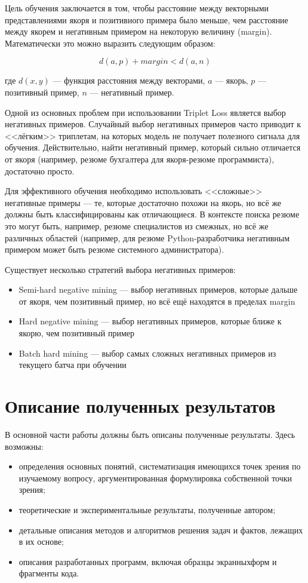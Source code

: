 \documentclass[14pt]{mmcs_article}
\begin{document}
Цель обучения заключается в том, чтобы расстояние между векторными представлениями якоря и позитивного примера было меньше, чем расстояние между якорем и негативным примером на некоторую величину (margin). Математически это можно выразить следующим образом:

\[ d(a,p) + margin < d(a,n) \]

где $d(x,y)$ --- функция расстояния между векторами, $a$ --- якорь, $p$ --- позитивный пример, $n$ --- негативный пример.

Одной из основных проблем при использовании Triplet Loss является выбор негативных примеров. Случайный выбор негативных примеров часто приводит к <<лёгким>> триплетам, на которых модель не получает полезного сигнала для обучения. Действительно, найти негативный пример, который сильно отличается от якоря (например, резюме бухгалтера для якоря-резюме программиста), достаточно просто.

Для эффективного обучения необходимо использовать <<сложные>> негативные примеры --- те, которые достаточно похожи на якорь, но всё же должны быть классифицированы как отличающиеся. В контексте поиска резюме это могут быть, например, резюме специалистов из смежных, но всё же различных областей (например, для резюме Python-разработчика негативным примером может быть резюме системного администратора).

Существует несколько стратегий выбора негативных примеров:
\begin{itemize}
  \item Semi-hard negative mining --- выбор негативных примеров, которые дальше от якоря, чем позитивный пример, но всё ещё находятся в пределах margin
  \item Hard negative mining --- выбор негативных примеров, которые ближе к якорю, чем позитивный пример
  \item Batch hard mining --- выбор самых сложных негативных примеров из текущего батча при обучении
\end{itemize}




\newpage
\section{Описание полученных результатов}\label{dsfs}

В основной части работы должны быть описаны полученные результаты. Здесь возможны:
\begin{itemize}
  \item определения основных понятий, систематизация имеющихся точек зрения по изучаемому вопросу, аргументированная формулировка собственной точки зрения;
  \item теоретические и экспериментальные результаты, полученные автором;
  \item детальные описания методов и алгоритмов решения задач и фактов, лежащих в их основе;
  \item описания разработанных программ, включая образцы экранных\linebreak форм и фрагменты кода.
\end{itemize}
\end{document}
